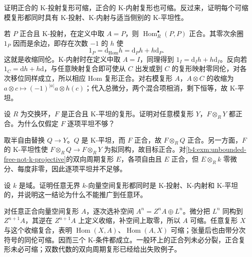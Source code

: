 \begin{optionalexercise}\label{b4:ex:18-acyclic-k-projective}
	证明正合的 K-投射复形可缩，正合的 K-内射复形也可缩。反过来，证明每个可缩模复形都同时具有 K-投射、K-内射与适当侧别的 K-平坦性。
\end{optionalexercise}
\begin{solution}
	若 \(P\) 正合且 K-投射，在定义中取 \(A=P\)，则 \(\operatorname{Hom}_R^\bullet(P,P)\) 正合。其零次余圈 \(1_P\) 因而是余边，即存在次数 \(-1\) 的 \(h\) 使
	\[
		1_P=\mathrm{d}_{\operatorname{Hom}}h=\mathrm{d}_Ph+h\mathrm{d}_P.
	\]
	这就是收缩同伦。K-内射时在定义中取 \(A=I\)，同理得到 \(1_I=\mathrm{d}_Ih+h\mathrm{d}_I\)。反向若 \(1_C=\mathrm{d}h+h\mathrm{d}\)，与任意映射复合即可使从 \(C\) 出发或到 \(C\) 的复形映射零同伦，对各次移位同样成立，所以相应 Hom 复形正合。对右模复形 \(A\)，\(A\otimes C\) 的收缩为 \(a\otimes c\mapsto(-1)^{|a|}a\otimes h(c)\)；代入总微分，两个混合项相消，剩下恒等，故 K-平坦。
\end{solution}

\begin{optionalexercise}\label{b4:ex:18-acyclic-k-flat}
	设 \(R\) 为交换环，\(F\) 是正合且 K-平坦的复形。证明对任意模复形 \(Y\)，\(F\otimes_RY\) 都正合。为什么仅假定 \(F\) 逐项平坦不够？
\end{optionalexercise}
\begin{solution}
	取半自由替换 \(Q\to Y\)。\(Q\) 是 K-平坦，而 \(F\) 正合，故 \(F\otimes_RQ\) 正合。另一方面，\(F\) 的 K-平坦性使 \(F\otimes_RQ\to F\otimes_RY\) 为拟同构，故目标正合。对\cref{b4:exm:unbounded-free-not-k-projective}的双向周期复形 \(E\)，各项自由且 \(E\) 正合，但 \(E\otimes_Rk\) 零微分、每度非零，因此逐项平坦并不足够。
\end{solution}

\begin{optionalexercise}\label{b4:ex:18-field-unbounded}
	设 \(k\) 是域。证明任意无界 \(k\)-向量空间复形都同时是 K-投射、K-内射和 K-平坦的，并说明这一结论为什么不能推广到任意环。
\end{optionalexercise}
\begin{solution}
	对任意正合向量空间复形 \(A\)，逐次选补空间 \(A^n=Z^nA\oplus L^n\)。微分把 \(L^n\) 同构到 \(Z^{n+1}A\)，其逆在 \(Z^{n+1}A\) 上定义收缩，补空间上取零，所以 \(A\) 可缩。任意复形 \(X\) 与这个收缩复合，表明 \(\operatorname{Hom}(X,A)\)、\(\operatorname{Hom}(A,X)\) 可缩；张量后也由带分次符号的同伦可缩。因而三个 K-条件都成立。一般环上的正合列未必分裂，正合复形未必可缩；双数代数的双向周期复形已经给出失败例子。
\end{solution}
